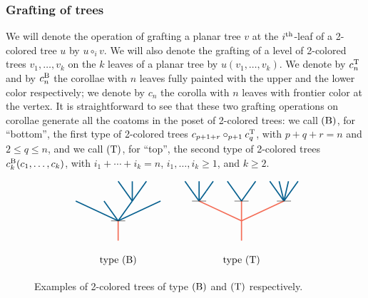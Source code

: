 \documentclass[10pt]{amsart}
\theoremstyle{remark}
\begin{document}
\subsubsection{Grafting of trees} \label{sss:grafting}

We will denote the operation of grafting a planar tree $v$ at the $i^{\rm th}$-leaf of a 2-colored tree $u$ by $u \circ_i v$. 
We will also denote the grafting of a level of 2-colored trees $v_1, \ldots, v_k$ on the $k$ leaves of a planar tree by $u(v_1, \ldots, v_k)$. 
We denote by $c^{\mathrm{T}}_n$ and by $c^{\mathrm{B}}_n$ the corollae with $n$ leaves fully painted with the upper and the lower color respectively; we denote by $c_n$ the corolla with $n$ leaves with frontier color at the vertex. 
It is straightforward to see that these two grafting operations on corollae generate all the coatoms in the poset of 2-colored trees: we call $(\mathrm{B})$, for ``bottom'', the first type of 2-colored trees $c_{p+1+r}\circ_{p+1} c^{\mathrm{T}}_q$, with $p+q+r=n$ and $2\leq q\leq n$, and we call  $(\mathrm{T})$, for ``top'', the second type of 2-colored trees $c^{\mathrm{B}}_k(c_1, \ldots, c_k)$, with $i_1+\cdots+i_k=n$, $i_1, \ldots,i_k\geq 1$, and $k\geq 2$.

\begin{figure}[h]
\[\vcenter{\hbox{
\begin{tikzpicture}[yscale=0.7,xscale=1]
\draw[very thick, MidnightBlue] (0.5,1)--(0,2);
\draw[very thick, MidnightBlue] (0.5,1)--(0.5,2);
\draw[very thick, MidnightBlue] (0.5,1)--(1,2);
\draw[very thick, MidnightBlue] (0,0)--(0.5, 1); 
\draw[very thick, MidnightBlue] (0,0)--(-0.5, 1); 
\draw[very thick, MidnightBlue] (0,0)--(-1.5,1);
\draw[very thick, MidnightBlue] (0,0)--(1.5, 1);
\draw[very thick, Red!60] (0,-1)--(0, 0); 
\draw (-0.25,0) to (0.25,0); 
\draw (0,-2) node {type $(\B)$};
\end{tikzpicture}}}\qquad \vcenter{\hbox{
\begin{tikzpicture}[yscale=0.7,xscale=1]
\draw[very thick, MidnightBlue] (-1.5,1)--(-1.5,2);
\draw[very thick, MidnightBlue] (-2,2) -- (-1.75,1.5);
\draw[very thick, MidnightBlue] (-1.25, 1.5) -- (-1,2);
\draw[very thick, MidnightBlue] (-0.5,2) -- (0,1);
\draw[very thick, MidnightBlue] (0,1)--(0.5,2);
\draw[very thick, MidnightBlue] (1.5,1)--(1,2);
\draw[very thick, MidnightBlue] (1.5,1)--(1.33,2);
\draw[very thick, MidnightBlue] (1.5,1)--(1.66,2);
\draw[very thick, MidnightBlue] (1.5,1)--(2,2);
\draw[very thick, MidnightBlue] (-1.5,1)--(-1.75, 1.5); 
\draw[very thick, MidnightBlue] (-1.5,1)--(-1.25, 1.5); 
\draw[very thick, Red!60] (0,-1)--(0, 1); 
\draw[very thick, Red!60] (0,0)--(-1.5,1);
\draw[very thick, Red!60] (0,0)--(1.5, 1);
\draw (-1.75,1) to (-1.25,1); 
\draw (-0.25,1) to (0.25,1); 
\draw (1.25,1) to (1.75,1);
\draw (0,-2) node {type $(\T)$};
\end{tikzpicture}}}\]
\caption{Examples of 2-colored trees of type $(\mathrm{B})$ and $(\mathrm{T})$ respectively. }
\label{Fig5:FacetsColoredTrees}
\end{figure}
\end{document}
